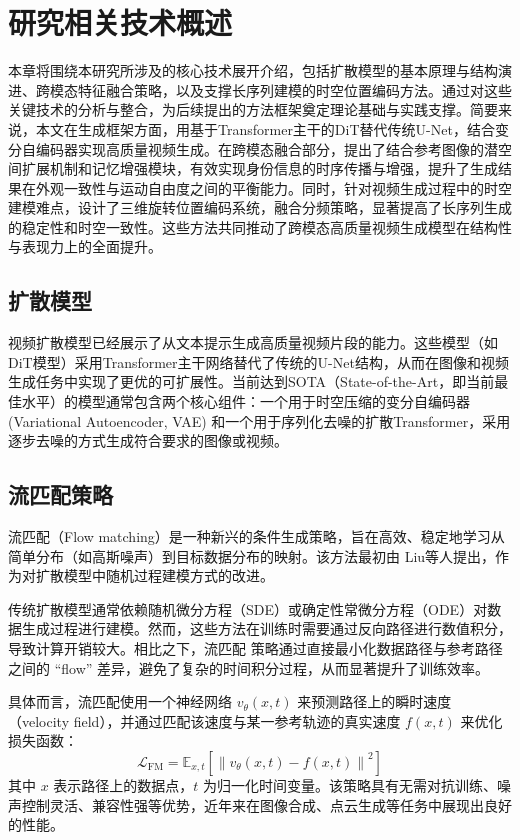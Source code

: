 \cleardoublepage
\section{研究相关技术概述}
本章将围绕本研究所涉及的核心技术展开介绍，包括扩散模型的基本原理与结构演进、跨模态特征融合策略，以及支撑长序列建模的时空位置编码方法。通过对这些关键技术的分析与整合，为后续提出的方法框架奠定理论基础与实践支撑。简要来说，本文在生成框架方面，用基于Transformer主干的DiT替代传统U-Net，结合变分自编码器实现高质量视频生成。在跨模态融合部分，提出了结合参考图像的潜空间扩展机制和记忆增强模块，有效实现身份信息的时序传播与增强，提升了生成结果在外观一致性与运动自由度之间的平衡能力。同时，针对视频生成过程中的时空建模难点，设计了三维旋转位置编码系统，融合分频策略，显著提高了长序列生成的稳定性和时空一致性。这些方法共同推动了跨模态高质量视频生成模型在结构性与表现力上的全面提升。

\subsection{扩散模型}
视频扩散模型已经展示了从文本提示生成高质量视频片段的能力。这些模型（如DiT模型）采用Transformer主干网络替代了传统的U-Net结构，从而在图像和视频生成任务中实现了更优的可扩展性。当前达到SOTA（State-of-the-Art，即当前最佳水平）的模型通常包含两个核心组件：一个用于时空压缩的变分自编码器 (Variational Autoencoder, VAE) 和一个用于序列化去噪的扩散Transformer，采用逐步去噪的方式生成符合要求的图像或视频。
\subsection{流匹配策略}

流匹配（Flow matching）是一种新兴的条件生成策略，旨在高效、稳定地学习从简单分布（如高斯噪声）到目标数据分布的映射。该方法最初由 Liu\cite{liu2022rectified}等人提出，作为对扩散模型中随机过程建模方式的改进。

传统扩散模型通常依赖随机微分方程（SDE）或确定性常微分方程（ODE）对数据生成过程进行建模。然而，这些方法在训练时需要通过反向路径进行数值积分，导致计算开销较大。相比之下，流匹配 策略通过直接最小化数据路径与参考路径之间的 ``flow'' 差异，避免了复杂的时间积分过程，从而显著提升了训练效率。

具体而言，流匹配使用一个神经网络 $v_\theta(x, t)$ 来预测路径上的瞬时速度（velocity field），并通过匹配该速度与某一参考轨迹的真实速度 $f(x, t)$ 来优化损失函数：
\[
\mathcal{L}_{\text{FM}} = \mathbb{E}_{x, t} \left[ \left\| v_\theta(x, t) - f(x, t) \right\|^2 \right]
\]
其中 $x$ 表示路径上的数据点，$t$ 为归一化时间变量。该策略具有无需对抗训练、噪声控制灵活、兼容性强等优势，近年来在图像合成、点云生成等任务中展现出良好的性能。

